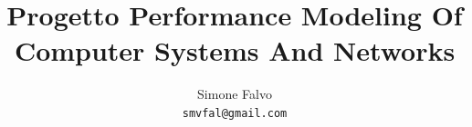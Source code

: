 \documentclass[a4paper,titlepage]{article}
\begin{document}

\title{
  Progetto Performance Modeling Of Computer Systems And Networks
}
\author{
  Simone Falvo\\
  \texttt{smvfal@gmail.com}
}

\date{}


\maketitle

%

\tableofcontents
\newpage
\end{document}

